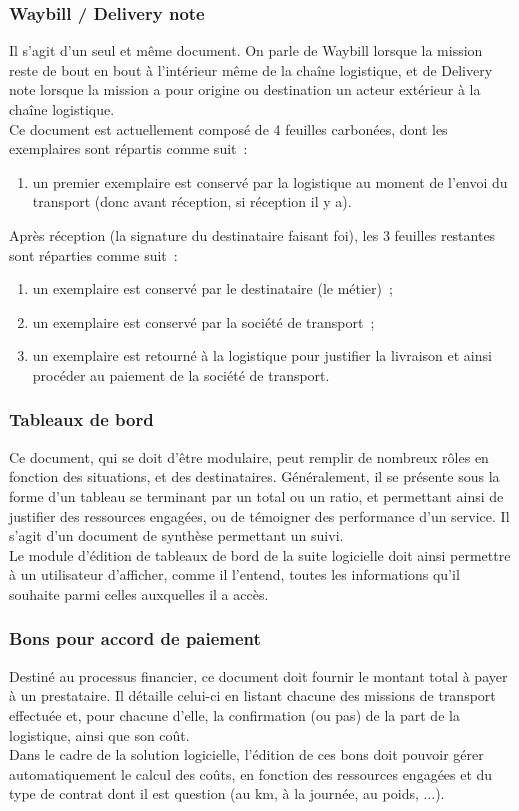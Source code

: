 \documentclass[11pt,fleqn]{report}
\begin{document}
\subsubsection{Waybill / Delivery note}
Il s'agit d'un seul et même document. On parle de Waybill lorsque la mission reste de bout en bout à l'intérieur même de la chaîne logistique, et de Delivery note lorsque la mission a pour origine ou destination un acteur extérieur à la chaîne logistique.
\\
Ce document est actuellement composé de 4 feuilles carbonées, dont les exemplaires sont répartis comme suit~:
\begin{enumerate}
	\item un premier exemplaire est conservé par la logistique au moment de l'envoi du transport (donc avant réception, si réception il y a).
\end{enumerate}
Après réception (la signature du destinataire faisant foi), les 3 feuilles restantes sont réparties comme suit~:
\begin{enumerate}
	\item un exemplaire est conservé par le destinataire (le métier)~;
	\item un exemplaire est conservé par la société de transport~;
	\item un exemplaire est retourné à la logistique pour justifier la livraison et ainsi procéder au paiement de la société de transport.
\end{enumerate}

\subsubsection{Tableaux de bord}
Ce document, qui se doit d'être modulaire, peut remplir de nombreux rôles en fonction des situations, et des destinataires. Généralement, il se présente sous la forme d'un tableau se terminant par un total ou un ratio, et permettant ainsi de justifier des ressources engagées, ou de témoigner des performance d'un service. Il s'agit d'un document de synthèse permettant un suivi.
\\
Le module d'édition de tableaux de bord de la suite logicielle doit ainsi permettre à un utilisateur d'afficher, comme il l'entend, toutes les informations qu'il souhaite parmi celles auxquelles il a accès.

\subsubsection{Bons pour accord de paiement}
Destiné au processus financier, ce document doit fournir le montant total à payer à un prestataire. Il détaille celui-ci en listant chacune des missions de transport effectuée et, pour chacune d'elle, la confirmation (ou pas) de la part de la logistique, ainsi que son coût.
\\
Dans le cadre de la solution logicielle, l'édition de ces bons doit pouvoir gérer automatiquement le calcul des coûts, en fonction des ressources engagées et du type de contrat dont il est question (au km, à la journée, au poids, ...).
\end{document}
